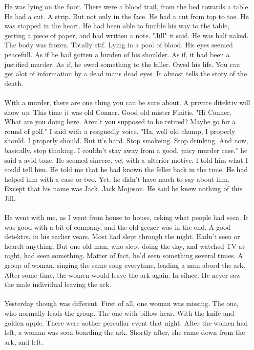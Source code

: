 \documentclass[]{article}
\begin{document}
He was lying on the floor. There were a blood trail, from the bed towards a table. He had a cut. A strip. But not only in the face. He had a cut from top to toe. He was stapped in the heart. He had been able to fumble his way to the table, getting a piece of paper, and had written a note. "Jill" it said. He was half naked. The body was frozen. Totally stif. Lying in a pool of blood. His eyes seemed peacefull. As if he had gotten a burden of his shoulder. As if, it had been a justified murder. As if, he owed something to the killer. Owed his life. You can get alot of information by a dead mans dead eyes. It almost tells the story of the death.
\\ \\
With a murder, there are one thing you can be sure about. A private ditektiv will show up. This time it was old Conner. Good old mister Finitis. "Hi Conner. What are you doing here. Aren't you supposed to be retired? Maybe go for a round of golf." I said with a resignedly voice. "Ha, well old chump, I properly should. I properly should. But it's hard. Stop smokeing. Stop drinking. And now, basically, stop thinking. I couldn't stay away from a good, juicy murder case." he said a avid tone. He seemed sincere, yet with a ulterior motive. I told him what I could tell him. He told me that he had known the feller back in the time. He had helped him with a case or two. Yet, he didn't have much to say about him. Except that his name was Jack. Jack Mojoson. He said he knew nothing of this Jill.
\\ \\
He went with me, as I went from house to house, asking what people had seen. It was good with a bit of company, and the old geezer was in the end, A good detektiv, in his earlier years. Most had slept through the night. Hadn't seen or heardt anything. But one old man, who slept doing the day, and watched TV at night, had seen something. Matter of fact, he'd seen something several times. A group of woman, singing the same song everytime, leading a man abord the ark. After some time, the women would leave the ark again. In silnce. He never saw the male individual leaving the ark.
\\ \\
Yesterday though was different. First of all, one woman was missing. The one, who normally leads the group. The one with billow hear. With the knife and golden apple. There were aother perculiar event that night. After the women had left, a woman was seen boarding the ark. Shortly after, she came down from the ark, and left. 
\end{document}

